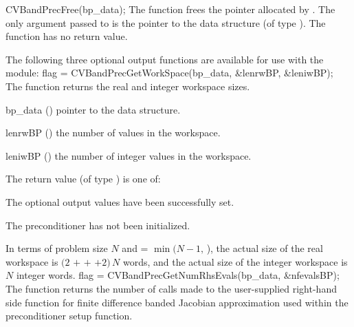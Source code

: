 {}
{
  CVBandPrecFree(bp\_data);
}
{
  The function  frees the pointer allocated by
  .
}
{
  The only argument passed to  is the pointer to the {\cvbandpre} 
  data structure (of type ).
}
{
  The function  has no return value.
}
{}


\noindent The following three optional output functions are available for use with 
the {\cvbandpre} module:
{
  flag = CVBandPrecGetWorkSpace(bp\_data, \&lenrwBP, \&leniwBP);
}
{
  The function  returns the
  {\cvbandpre} real and integer workspace sizes.
}
{
  \begin{args}[lenrwBP]
  \item[bp\_data] ()
    pointer to the {\cvbandpre} data structure.
  \item[lenrwBP] ()
    the number of  values in the {\cvbandpre} workspace.
  \item[leniwBP] ()
    the number of integer values in the {\cvbandpre} workspace.
  \end{args}
}
{
  The return value  (of type ) is one of:
  \begin{args}
  \item[\Id{CV\_SUCCESS}] 
    The optional output values have been successfully set.
  \item[\Id{CV\_PDATA\_NULL}]
    The {\cvbandpre} preconditioner has not been initialized.
  \end{args}
}
{
  In terms of problem size $N$ and  = $\min(N-1,\,$),
  the actual size of the real workspace is
  $(2$  $+$  $+$  $+2)\, N$  words,
  and the actual size of the integer workspace is $N$ integer words.
}
{
  flag = CVBandPrecGetNumRhsEvals(bp\_data, \&nfevalsBP);
}
{
  The function  returns the
  number of calls made to the user-supplied right-hand side function for
  finite difference banded Jacobian approximation used within
  the preconditioner setup function.
}
